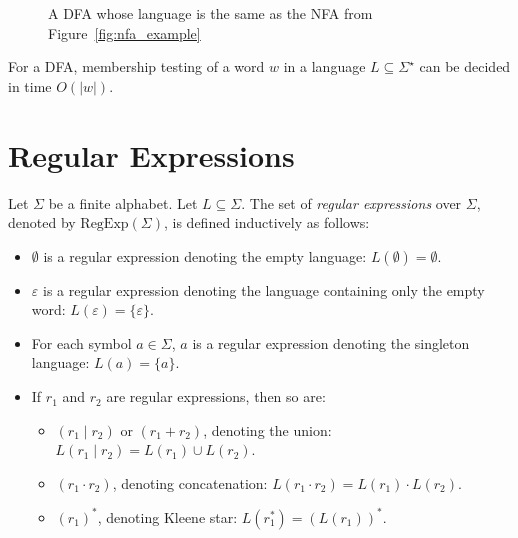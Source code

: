 \begin{figure}[H]
\centering
{}
\caption{A DFA whose language is the same as the NFA from Figure~\ref{fig:nfa_example}} 
\label{fig:dfa_example}
\end{figure}

For a DFA, membership testing of a word $w$ in a language $L \subseteq \Sigma^\star$ can be decided in time $O(|w|)$.

\section{Regular Expressions}
Let $\Sigma$ be a finite alphabet. Let $L \subseteq \Sigma$. The set of \emph{regular expressions} over $\Sigma$, denoted by $\text{RegExp}(\Sigma)$, is defined inductively as follows:

\begin{itemize}
    \item $\emptyset$ is a regular expression denoting the empty language: $L(\emptyset) = \emptyset$.
    \item $\varepsilon$ is a regular expression denoting the language containing only the empty word: $L(\varepsilon) = \{ \varepsilon \}$.
    \item For each symbol $a \in \Sigma$, $a$ is a regular expression denoting the singleton language: $L(a) = \{ a \}$.
    \item If $r_1$ and $r_2$ are regular expressions, then so are:
    \begin{itemize}
        \item $(r_1 \mid r_2)$ or $(r_1 + r_2)$, denoting the union: $L(r_1 \mid r_2) = L(r_1) \cup L(r_2)$.
        \item $(r_1 \cdot r_2)$, denoting concatenation: $L(r_1 \cdot r_2) = L(r_1) \cdot L(r_2)$.
        \item $(r_1)^*$, denoting Kleene star: $L(r_1^*) = (L(r_1))^*$.
    \end{itemize}
\end{itemize}

